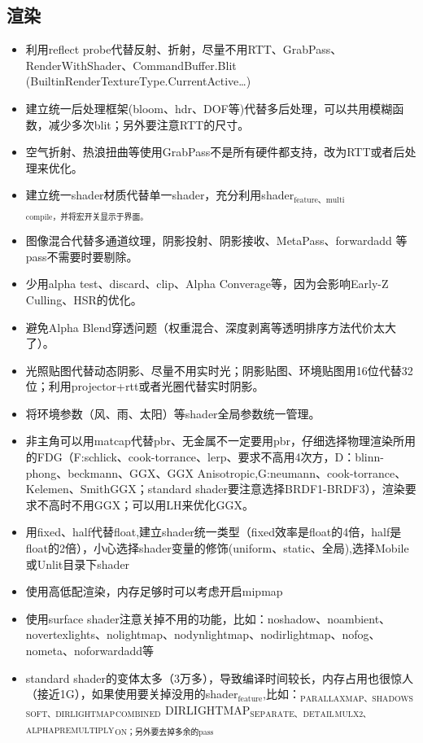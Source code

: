 \documentclass[9pt, b5paper]{article}
\begin{document}
\subsection{渲染}
\label{sec-5-1}
\begin{itemize}
\item 利用reflect probe代替反射、折射，尽量不用RTT、GrabPass、RenderWithShader、CommandBuffer.Blit (BuiltinRenderTextureType.CurrentActive\ldots{})
\item 建立统一后处理框架(bloom、hdr、DOF等)代替多后处理，可以共用模糊函数，减少多次blit；另外要注意RTT的尺寸。
\item 空气折射、热浪扭曲等使用GrabPass不是所有硬件都支持，改为RTT或者后处理来优化。
\item 建立统一shader材质代替单一shader，充分利用shader$_{\text{feature、multi}}$$_{\text{compile，并将宏开关显示于界面。}}$
\item 图像混合代替多通道纹理，阴影投射、阴影接收、MetaPass、forwardadd 等pass不需要时要剔除。
\item 少用alpha test、discard、clip、Alpha Converage等，因为会影响Early-Z Culling、HSR的优化。
\item 避免Alpha Blend穿透问题（权重混合、深度剥离等透明排序方法代价太大了）。
\item 光照贴图代替动态阴影、尽量不用实时光；阴影贴图、环境贴图用16位代替32位；利用projector+rtt或者光圈代替实时阴影。
\item 将环境参数（风、雨、太阳）等shader全局参数统一管理。
\item 非主角可以用matcap代替pbr、无金属不一定要用pbr，仔细选择物理渲染所用的FDG（F:schlick、cook-torrance、lerp、要求不高用4次方，D：blinn-phong、beckmann、GGX、GGX Anisotropic,G:neumann、cook-torrance、Kelemen、SmithGGX；standard shader要注意选择BRDF1-BRDF3），渲染要求不高时不用GGX；可以用LH来优化GGX。
\item 用fixed、half代替float,建立shader统一类型（fixed效率是float的4倍，half是float的2倍），小心选择shader变量的修饰(uniform、static、全局),选择Mobile或Unlit目录下shader
\item 使用高低配渲染，内存足够时可以考虑开启mipmap
\item 使用surface shader注意关掉不用的功能，比如：noshadow、noambient、novertexlights、nolightmap、nodynlightmap、nodirlightmap、nofog、nometa、noforwardadd等
\item standard shader的变体太多（3万多），导致编译时间较长，内存占用也很惊人（接近1G），如果使用要关掉没用的shader$_{\text{feature}}$,比如：$_{\text{PARALLAXMAP、SHADOWS}}$$_{\text{SOFT、DIRLIGHTMAP}}$$_{\text{COMBINED}}$ DIRLIGHTMAP$_{\text{SEPARATE、}}$$_{\text{DETAIL}}$$_{\text{MULX2、}}$$_{\text{ALPHAPREMULTIPLY}}$$_{\text{ON；另外要去掉多余的pass}}$
$$
\end{itemize}
\end{document}
